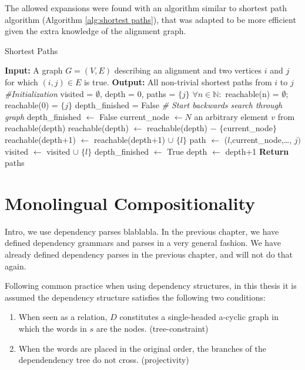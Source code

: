 \documentclass{report}
\begin{document}
The allowed expansions were found with an algorithm similar to  shortest path algorithm (Algorithm \ref{alg:shortest paths}), that was adapted to be more efficient given the extra knowledge of the alignment graph.

\begin{algorithm}[!ht]
\caption{Shortest Paths}\label{alg:shortest paths}
\begin{algorithmic}
\STATE \textbf{Input:} A graph $G = (V,E)$ describing an alignment and two vertices $i$ and $j$ for which $(i,j)\in E$ is true.
\STATE \textbf{Output:} All non-trivial shortest paths from $i$ to $j$
\STATE \textit{\#Initialization}
\STATE visited = $\emptyset$, depth = $0$, paths = $\{j\}$
\STATE $\forall n\in\mathbb{N}:$ reachable(n) = $\emptyset$; reachable($0$) = $\{j\}$
\STATE depth\_finished = False
\STATE \textit{\# Start backwards search through graph}
		\STATE depth\_finished $\leftarrow$ False
		\STATE current\_node $\leftarrow N$ an arbitrary element $v$ from reachable(depth)
		\STATE reachable(depth) $\leftarrow$ reachable(depth) $-$ $\{$current\_node$\}$
				\STATE reachable(depth+1) $\leftarrow$ reachable(depth+1) $\cup$ $\{l\}$
					\STATE path $\leftarrow$ ($l$,current\_node,\ldots, $j)$
				\ENDFOR
			\ENDIF
		\STATE visited $\leftarrow$ visited $\cup$ $\{l\}$
		\ENDFOR
	\STATE depth\_finished $\leftarrow$ True
	\STATE depth $\leftarrow$ depth+1
	\ENDWHILE
\ENDWHILE
\STATE \textbf{Return} paths
\end{algorithmic}
\end{algorithm}


\section{Monolingual Compositionality}

Intro, we use dependency parses blablabla. In the previous chapter, we have defined dependency grammars and parses in a very general fashion. We have already defined dependency parses in the previous chapter, and will not do that again.



Following common practice when using dependency structures, in this thesis it is assumed the dependency structure satisfies the following two conditions:\begin{enumerate}
\item When seen as a relation, $D$ constitutes a single-headed a-cyclic graph in which the words in $s$ are the nodes. (tree-constraint)
\item When the words are placed in the original order, the branches of the dependendency tree do not cross. (projectivity)
\end{enumerate}
\end{document}
